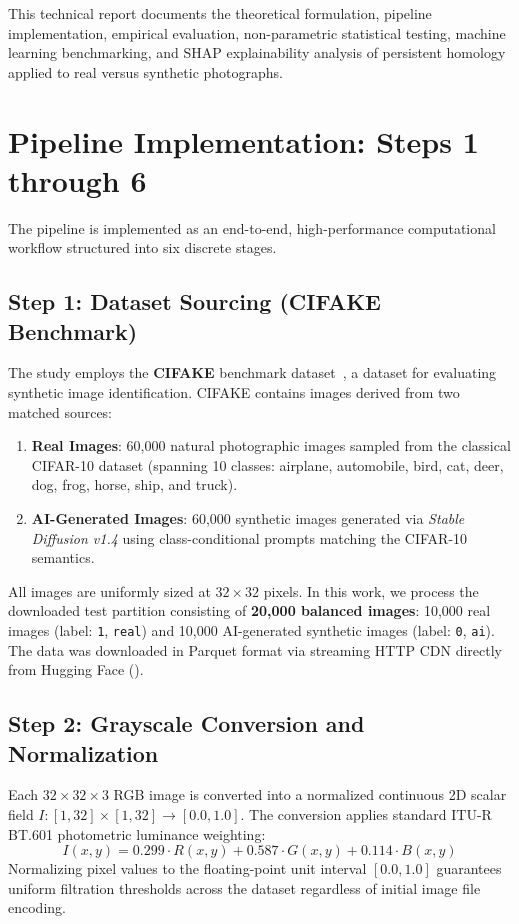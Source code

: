 \documentclass[11pt,a4paper]{article}
\begin{document}
This technical report documents the theoretical formulation, pipeline implementation, empirical evaluation, non-parametric statistical testing, machine learning benchmarking, and SHAP explainability analysis of persistent homology applied to real versus synthetic photographs.

\section{Pipeline Implementation: Steps 1 through 6}

The pipeline is implemented as an end-to-end, high-performance computational workflow structured into six discrete stages.

\subsection{Step 1: Dataset Sourcing (CIFAKE Benchmark)}
The study employs the \textbf{CIFAKE} benchmark dataset~\cite{bird2023cifake}, a dataset for evaluating synthetic image identification. CIFAKE contains images derived from two matched sources:
\begin{enumerate}[noitemsep]
    \item \textbf{Real Images}: 60,000 natural photographic images sampled from the classical CIFAR-10 dataset (spanning 10 classes: airplane, automobile, bird, cat, deer, dog, frog, horse, ship, and truck).
    \item \textbf{AI-Generated Images}: 60,000 synthetic images generated via \textit{Stable Diffusion v1.4} using class-conditional prompts matching the CIFAR-10 semantics.
\end{enumerate}
All images are uniformly sized at $32 \times 32$ pixels. In this work, we process the downloaded test partition consisting of \textbf{20,000 balanced images}: 10,000 real images (label: \texttt{1}, \texttt{real}) and 10,000 AI-generated synthetic images (label: \texttt{0}, \texttt{ai}). The data was downloaded in Parquet format via streaming HTTP CDN directly from Hugging Face ().

\subsection{Step 2: Grayscale Conversion and Normalization}
Each $32 \times 32 \times 3$ RGB image is converted into a normalized continuous 2D scalar field $I: [1, 32] \times [1, 32] \to [0.0, 1.0]$. The conversion applies standard ITU-R BT.601 photometric luminance weighting:
\begin{equation}
    I(x, y) = 0.299 \cdot R(x, y) + 0.587 \cdot G(x, y) + 0.114 \cdot B(x, y)
\end{equation}
Normalizing pixel values to the floating-point unit interval $[0.0, 1.0]$ guarantees uniform filtration thresholds across the dataset regardless of initial image file encoding.
\end{document}
